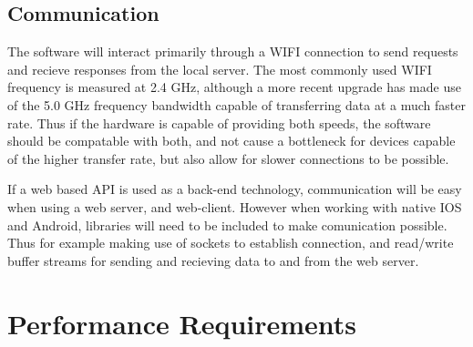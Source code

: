 \documentclass[11pt]{article}
\begin{document}
	\subsection{Communication}
	The software will interact primarily through a WIFI connection to send requests and recieve responses from the local server.  The most commonly used WIFI frequency is measured at 2.4 GHz, although a more recent upgrade has made use of the 5.0 GHz frequency bandwidth capable of transferring data at a much faster rate.  Thus if the hardware is capable of providing both speeds, the software should be compatable with both, and not cause a bottleneck for devices capable of the higher transfer rate, but also allow for slower connections to be possible.  
	
	If a web based API is used as a back-end technology, communication will be easy when using a web server, and web-client.  However when working with native IOS and Android, libraries will need to be included to make comunication possible.  Thus for example making use of sockets to establish connection, and read/write buffer streams for sending and recieving data to and from the web server.  
	
	\section{Performance Requirements}
\end{document}
